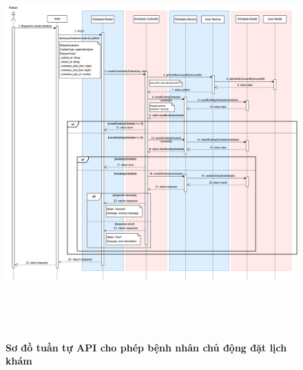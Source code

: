 \begin{figure}[H]
	\centering
	\includegraphics[width=15cm,height=15cm]{Images/api_sequence/schedule/createScheduleByPatient.drawio.png}
	\caption[Sơ đồ tuần tự API cho phép bệnh nhân chủ động đặt lịch khám]{\bfseries \fontsize{12pt}{0pt}\selectfont Sơ đồ tuần tự API cho phép bệnh nhân chủ động đặt lịch khám}
	\label{sequence_diagram_create_schedule_by_patient}
\end{figure}

